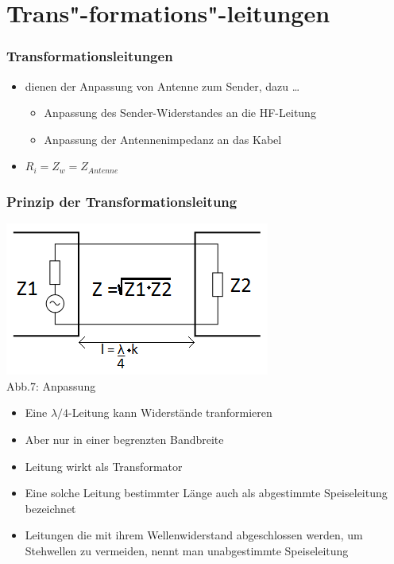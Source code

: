 \section*{Trans"-formations"-leitungen}
\begin{frame}
  \frametitle{Transformationsleitungen}
  \begin{itemize}
    \item dienen der Anpassung von Antenne zum Sender, dazu \dots
    \begin{itemize}
        \item Anpassung des Sender-Widerstandes an die HF-Leitung
        \item Anpassung der Antennenimpedanz an das Kabel
    \end{itemize}
    \item $R_i = Z_w = Z_{Antenne}$
  \end{itemize}
\end{frame}

\begin{frame}
  \frametitle{Prinzip der Transformationsleitung}
  \begin{center}
    \includegraphics[width=\textwidth,height=.35\textheight,keepaspectratio]{a10/Anpassung.png}\\
    {\tiny Abb.7: Anpassung \cite{wp}}
  \end{center}
  \begin{itemize}
    \item	Eine $\lambda /4$-Leitung kann Widerstände tranformieren
    \item	Aber nur in einer begrenzten Bandbreite
    \item	Leitung wirkt als Transformator
    \item	Eine solche Leitung bestimmter Länge auch als abgestimmte Speiseleitung bezeichnet
    \item	Leitungen die mit ihrem Wellenwiderstand abgeschlossen werden, um Stehwellen zu vermeiden, nennt man unabgestimmte Speiseleitung
  \end{itemize}
\end{frame}

